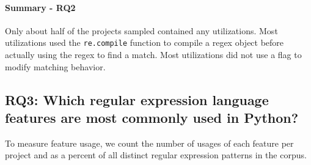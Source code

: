 %
%
%
%
%



% 


\paragraph{Summary - RQ2}

Only about half of the projects sampled contained any utilizations.  Most utilizations used the {\tt re.compile} function to compile a regex object before actually using the regex to find a match.  Most utilizations did not use a flag to modify matching behavior.  





\subsection{RQ3: Which regular expression language features are most commonly used in Python?}
\label{results:rq3}

To measure feature usage, we  count the number of usages of each feature per project and as a percent of all distinct regular expression patterns in the corpus.



